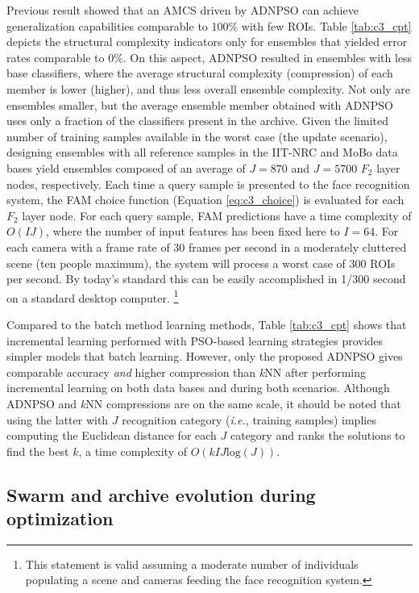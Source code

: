 Previous result showed that an AMCS driven by ADNPSO can achieve generalization capabilities comparable to 100\% with few ROIs.
Table \ref{tab:c3_cpt} depicts the structural complexity indicators only for ensembles that yielded error rates comparable to 0\%.
On this aspect, ADNPSO resulted in ensembles with less base classifiers, where the average structural complexity (compression) of each member is lower (higher), and thus less overall ensemble complexity.
Not only are ensembles smaller, but the average ensemble member obtained with ADNPSO uses only a fraction of the classifiers present in the archive.
Given the limited number of training samples available in the worst case (the update scenario), designing ensembles with all reference samples in the IIT-NRC and MoBo data bases yield ensembles composed of an average of $J=870$ and $J=5700$ $F_2$ layer nodes, respectively.
Each time a query sample is presented to the face recognition system, the FAM choice function (Equation \ref{eq:c3_choice}) is evaluated for each $F_2$ layer node.
For each query sample, FAM predictions have a time complexity of $O(IJ)$, where the number of input features has been fixed here to $I=64$.
For each camera with a frame rate of 30 frames per second in a moderately cluttered scene (ten people maximum), the system will process a worst case of 300 ROIs per second.
By today's standard this can be easily accomplished in 1/300 second on a standard desktop computer.%
\footnote{This statement is valid assuming a moderate number of individuals populating a scene and cameras feeding the face recognition system.}
 
Compared to the batch method learning methods, Table \ref{tab:c3_cpt} shows that incremental learning performed with PSO-based learning strategies provides simpler models that batch learning.
However, only the proposed ADNPSO gives comparable accuracy \emph{and} higher compression than \textit{k}NN after performing incremental learning on both data bases and during both scenarios.
Although ADNPSO and \textit{k}NN compressions are on the same scale, it should be noted that using the latter with $J$ recognition category (\emph{i.e.}, training samples) implies computing the Euclidean distance for each $J$ category and ranks the solutions to find the best $k$, a time complexity of $O(kI J\text{log}(J))$.


\subsection{Swarm and archive evolution during optimization}
\label{sec:c3_obj_space}

